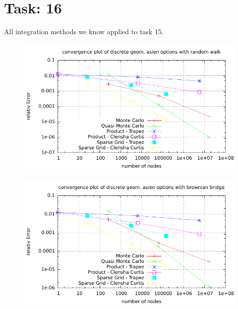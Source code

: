 \documentclass{article}
\begin{document}
\section*{Task: 16}
All integration methods we know applied to task 15.
\begin{figure}[htbp]
 \centering
    \includegraphics[width=1.0\textwidth]{../Task16/sh3_task16_convergence_plot_rw.pdf}
\end{figure}

\begin{figure}[htbp]
 \centering
    \includegraphics[width=1.0\textwidth]{../Task16/sh3_task16_convergence_plot_bb.pdf}
\end{figure}
\end{document}
